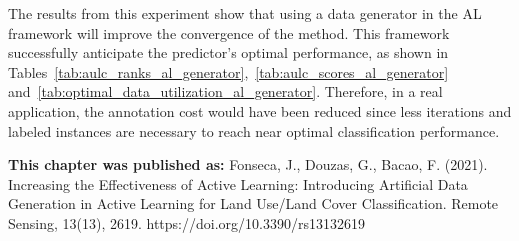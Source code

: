 The results from this experiment show that using a data generator in the AL
framework will improve the convergence of the method. This framework
successfully anticipate the predictor's optimal performance, as shown in
Tables~\ref{tab:aulc_ranks_al_generator},~\ref{tab:aulc_scores_al_generator}
and~\ref{tab:optimal_data_utilization_al_generator}. Therefore, in a real application, the
annotation cost would have been reduced since less iterations and labeled
instances are necessary to reach near optimal classification performance.

\textbf{This chapter was published as:} Fonseca, J., Douzas, G., Bacao, F.
(2021). Increasing the Effectiveness of Active Learning: Introducing
Artificial Data Generation in Active Learning for Land Use/Land Cover
Classification.  Remote Sensing, 13(13), 2619.
https://doi.org/10.3390/rs13132619


